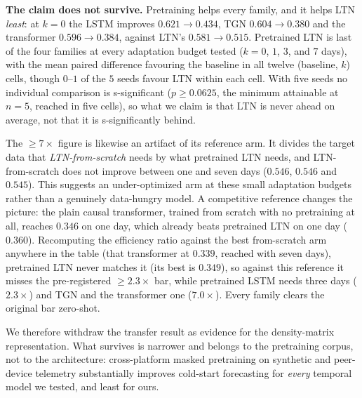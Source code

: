 \documentclass[journal]{IEEEtran}
\begin{document}
\textbf{The claim does not survive.} Pretraining helps every family, and it helps LTN
\emph{least}: at $k{=}0$ the LSTM improves $0.621 \to 0.434$, TGN $0.604 \to 0.380$
and the transformer $0.596 \to 0.384$, against LTN's $0.581 \to 0.515$. Pretrained LTN
is last of the four families at every adaptation budget tested ($k{=}0$, $1$, $3$,
and $7$ days), with the mean paired difference favouring the baseline in all twelve
(baseline, $k$) cells, though $0$--$1$ of the $5$ seeds favour LTN within each cell.
With five seeds no individual comparison is s-significant ($p \ge 0.0625$, the minimum
attainable at $n{=}5$, reached in five cells), so what we claim is that LTN is never ahead on average, not
that it is s-significantly behind.

The $\geq 7\times$ figure is likewise an artifact of its reference arm. It divides the
target data that \emph{LTN-from-scratch} needs by what pretrained LTN needs, and
LTN-from-scratch does not improve between one and seven days ($0.546$, $0.546$ and $0.545$).
This suggests an under-optimized arm at these small adaptation budgets rather
than a genuinely data-hungry model. A competitive reference changes the picture: the
plain causal transformer, trained from scratch with no pretraining at all, reaches
$0.346$ on one day, which already beats pretrained LTN on one day ($0.360$).
Recomputing the efficiency ratio against the best from-scratch arm anywhere in the
table (that transformer at $0.339$, reached with seven days), pretrained LTN never
matches it (its best is $0.349$), so against this reference it misses the
pre-registered $\geq 2.3\times$ bar, while pretrained LSTM needs three days
($2.3\times$) and TGN and the transformer one ($7.0\times$). Every family clears the original bar
zero-shot.

We therefore withdraw the transfer result as evidence for the density-matrix
representation. What survives is narrower and belongs to the pretraining corpus, not
to the architecture: cross-platform masked pretraining on synthetic and peer-device
telemetry substantially improves cold-start forecasting for \emph{every} temporal
model we tested, and least for ours.
\end{document}
